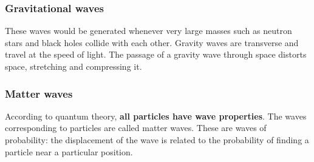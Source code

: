 \documentclass[a4paper,12pt]{article}
\begin{document}
\subsubsection*{Gravitational waves}
These waves would be generated whenever very large masses such as neutron stars and black holes collide with each other. Gravity waves are transverse and travel at the speed of light. The passage of a gravity wave through space distorts space, stretching and compressing it. 
\begin{center}
\end{center}
\subsubsection*{Matter waves}
According to quantum theory, \textbf{all particles have wave properties}. The waves corresponding to particles are called matter waves. These are waves of probability: the displacement of the wave is related to the probability of finding a particle near a particular position.
\end{document}
